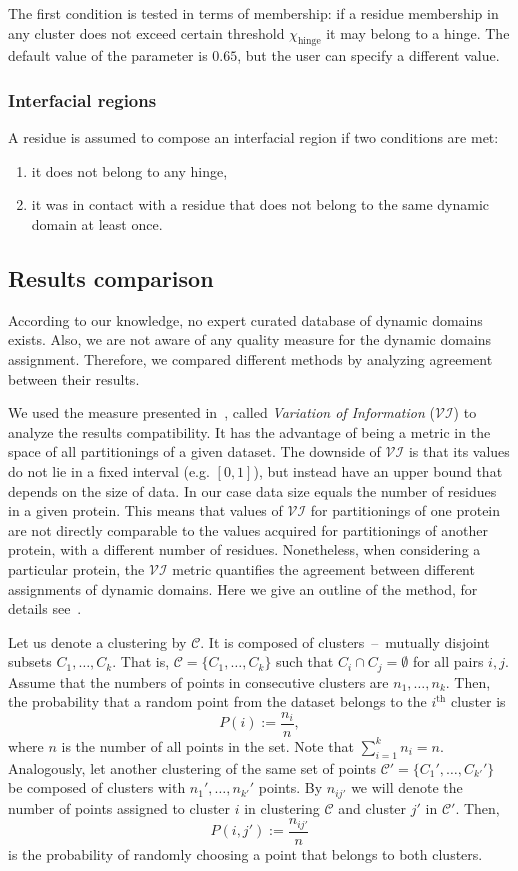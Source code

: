 \documentclass[a4paper,11pt,twoside]{book}%
\begin{document}
The first condition is tested in terms of membership: if a residue membership in any cluster does not exceed certain threshold $\chi_\text{hinge}$ it may belong to a hinge. 
The default value of the parameter is $0.65$, but the user can specify a different value.

\subsubsection*{Interfacial regions}
A residue is assumed to compose an interfacial region if two conditions are met:
\begin{enumerate}
\item it does not belong to any hinge,
\item it was in contact with a residue that does not belong to the same dynamic domain at least once.
\end{enumerate}

\subsection*{Results comparison}
According to our knowledge, no expert curated database of dynamic domains exists.
Also, we are not aware of any quality measure for the dynamic domains assignment.
Therefore, we compared different methods by analyzing agreement between their results.

We used the measure presented in~\cite{meilua2007comparing}, called \emph{Variation of Information} ($\mathcal{VI}$) to analyze the results compatibility.
It has the advantage of being a metric in the space of all partitionings of a given dataset.
The downside of $\mathcal{VI}$ is that its values do not lie in a fixed interval (e.g. $[0,1]$), but instead have an upper bound that depends on the size of data.
In our case data size equals the number of residues in a given protein.
This means that values of $\mathcal{VI}$ for partitionings of one protein are not directly comparable to the values acquired for partitionings of another protein, with a different number of residues.
Nonetheless, when considering a particular protein, the $\mathcal{VI}$ metric quantifies the agreement between different assignments of dynamic domains.
Here we give an outline of the method, for details see~\cite{meilua2007comparing}.

Let us denote a clustering by $\mathcal{C}$.
It is composed of clusters~--~mutually disjoint subsets $C_1,\ldots,C_k$.
That is, $\mathcal{C} = \{ C_1,\ldots,C_k\}$ such that \mbox{$C_i \cap C_j = \emptyset$} for all pairs $i,j$.
Assume that the numbers of points in consecutive clusters are $n_1,\ldots,n_k$.
Then, the probability that a random point from the dataset belongs to the $i^{\textrm{th}}$ cluster is $$P(i):=\frac{n_i}{n},$$ where $n$ is the number of all points in the set.
Note that $\sum_{i=1}^k n_i = n$.
Analogously, let another clustering of the same set of points $\mathcal{C'}=\{ C_1',\ldots,C_{k'}' \}$ be composed of clusters with $n_1',\ldots,n_{k'}'$ points.
By $n_{ij'}$ we will denote the number of points assigned to cluster $i$ in clustering $\mathcal{C}$ and cluster $j'$ in $\mathcal{C'}$.
Then, $$P(i,j'):=\frac{n_{ij'}}{n} $$ is the probability of randomly choosing a point that belongs to both clusters.
\end{document}
